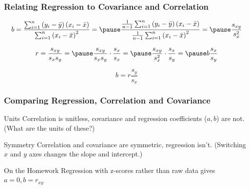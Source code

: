 \documentclass[handout]{beamer}
\begin{document}
\begin{frame}
	\frametitle{Relating Regression to Covariance and Correlation}
		$$b = \frac{\sum_{i=1}^n \left(y_i - \bar{y}\right)\left(x_i - \bar{x} \right)}{\sum_{i=1}^n \left(x_i - \bar{x}\right)^2} =\pause \frac{\frac{1}{n-1}\sum_{i=1}^n \left(y_i - \bar{y}\right)\left(x_i - \bar{x} \right)}{\frac{1}{n-1}\sum_{i=1}^n \left(x_i - \bar{x}\right)^2} =\pause \frac{s_{xy}}{s_x^2}$$\pause
		
		$$r = \frac{s_{xy}}{s_x s_y} =\pause\frac{s_{xy}}{s_x s_y} \cdot \frac{s_x}{s_x} =\pause  \frac{s_{xy}}{s_x^2} \cdot \frac{s_x}{s_y} =\pause b \frac{s_x}{s_y}$$\pause
		
		$$b = r\frac{s_y}{s_x}$$
\end{frame}
\begin{frame}
\frametitle{Comparing Regression, Correlation and Covariance}

\begin{block}{Units}
Correlation is unitless, covariance and regression coefficients ($a, b$) are not. (What are the units of these?)
\end{block}


\begin{block}{Symmetry}
Correlation and covariance are symmetric, regression isn't. (Switching $x$ and $y$ axes changes the slope and intercept.)
\end{block}

\begin{block}{On the Homework}
Regression with z-scores rather than raw data gives $a=0, b = r_{xy}$
\end{block}

\end{frame}
\end{document}
